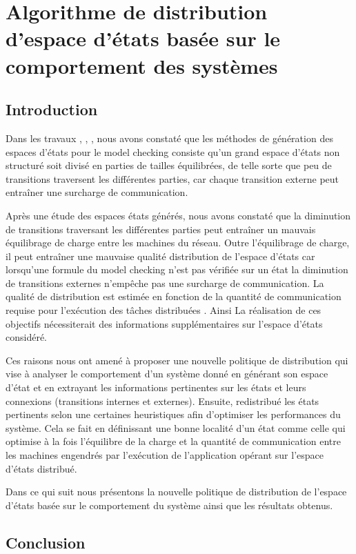 \chapter{Algorithme de distribution d’espace d’états basée sur le comportement des systèmes}
	\minitoc
	\newpage

 \section{Introduction}
Dans les travaux \citep{Saidouni2012}, \citep{TabibSaidouni2016}, \citep{BENSETIRA2017}, nous avons constaté que les méthodes de génération des espaces d’états pour le model checking consiste  qu’un grand espace d'états non structuré soit divisé en parties de tailles équilibrées, de telle sorte que peu de transitions traversent les différentes  parties, car chaque transition externe peut entraîner une surcharge de communication.

Après une étude des espaces états générés, nous avons constaté que la diminution de transitions traversant les différentes parties peut entraîner un mauvais équilibrage de charge entre les machines du réseau. Outre l’équilibrage de charge, il peut entraîner une mauvaise qualité distribution de l'espace d'états car lorsqu'une formule du model checking n'est pas vérifiée sur un état la diminution de transitions externes n'empêche pas une surcharge de communication. La qualité de distribution est estimée en fonction de la quantité de communication requise pour l’exécution des tâches distribuées \citep{EzekielLuttgen2008}. Ainsi La réalisation de ces objectifs nécessiterait des informations supplémentaires sur l’espace d’états considéré. 

Ces raisons nous ont amené à proposer une nouvelle politique de distribution qui vise à analyser le comportement d’un système donné en générant son espace d’état et en extrayant les informations pertinentes sur les états et leurs connexions (transitions internes et externes). Ensuite, redistribué les états pertinents selon une certaines heuristiques afin d’optimiser les performances du système. Cela se fait en définissant une bonne localité d’un état comme celle qui optimise à la fois l’équilibre de la charge et la quantité de communication entre les machines engendrés par l’exécution de l’application opérant sur l’espace d’états distribué.
 
Dans ce qui suit nous présentons la nouvelle politique de distribution de l’espace d’états basée sur le comportement du système ainsi que les résultats obtenus. 
 
 



\section{Conclusion}